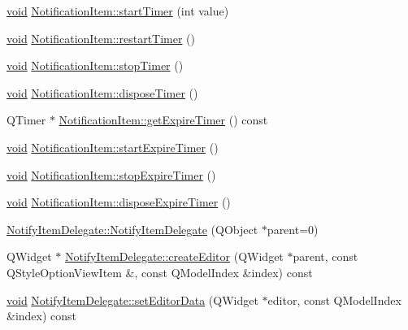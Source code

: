 \begin{DoxyCompactItemize}
\item 
\hyperlink{group___u_a_v_objects_plugin_ga444cf2ff3f0ecbe028adce838d373f5c}{void} \hyperlink{group___notify_plugin_gaa7aa70f2843fa4dfaf65d257280afc6b}{\-Notification\-Item\-::start\-Timer} (int value)
\item 
\hyperlink{group___u_a_v_objects_plugin_ga444cf2ff3f0ecbe028adce838d373f5c}{void} \hyperlink{group___notify_plugin_gacf26398de566bf5f6b947e9065841653}{\-Notification\-Item\-::restart\-Timer} ()
\item 
\hyperlink{group___u_a_v_objects_plugin_ga444cf2ff3f0ecbe028adce838d373f5c}{void} \hyperlink{group___notify_plugin_ga40c3dd7de6f84d1c49d6536d3bf7c310}{\-Notification\-Item\-::stop\-Timer} ()
\item 
\hyperlink{group___u_a_v_objects_plugin_ga444cf2ff3f0ecbe028adce838d373f5c}{void} \hyperlink{group___notify_plugin_gaa2f1891b46a9b84e08cd3cde71981655}{\-Notification\-Item\-::dispose\-Timer} ()
\item 
\-Q\-Timer $\ast$ \hyperlink{group___notify_plugin_gac3e54f4c867cf1ab32a5127dcc5dcebe}{\-Notification\-Item\-::get\-Expire\-Timer} () const 
\item 
\hyperlink{group___u_a_v_objects_plugin_ga444cf2ff3f0ecbe028adce838d373f5c}{void} \hyperlink{group___notify_plugin_ga1cea7db89fc4ba5cc6177e4676fc6f5b}{\-Notification\-Item\-::start\-Expire\-Timer} ()
\item 
\hyperlink{group___u_a_v_objects_plugin_ga444cf2ff3f0ecbe028adce838d373f5c}{void} \hyperlink{group___notify_plugin_gafff508e9352fb1a5ed40502e6845ebef}{\-Notification\-Item\-::stop\-Expire\-Timer} ()
\item 
\hyperlink{group___u_a_v_objects_plugin_ga444cf2ff3f0ecbe028adce838d373f5c}{void} \hyperlink{group___notify_plugin_ga701d292a397a1198e167f249475b77e0}{\-Notification\-Item\-::dispose\-Expire\-Timer} ()
\item 
\hyperlink{group___notify_plugin_ga356769d008d39fd8dfdf8377c20ea450}{\-Notify\-Item\-Delegate\-::\-Notify\-Item\-Delegate} (\-Q\-Object $\ast$parent=0)
\item 
\-Q\-Widget $\ast$ \hyperlink{group___notify_plugin_ga5b91b80661023d558e683e9b0fadca50}{\-Notify\-Item\-Delegate\-::create\-Editor} (\-Q\-Widget $\ast$parent, const \-Q\-Style\-Option\-View\-Item \&, const \-Q\-Model\-Index \&index) const 
\item 
\hyperlink{group___u_a_v_objects_plugin_ga444cf2ff3f0ecbe028adce838d373f5c}{void} \hyperlink{group___notify_plugin_ga75249b15c513ab2ea9691a7e2307ef19}{\-Notify\-Item\-Delegate\-::set\-Editor\-Data} (\-Q\-Widget $\ast$editor, const \-Q\-Model\-Index \&index) const 

\end{DoxyCompactItemize}
